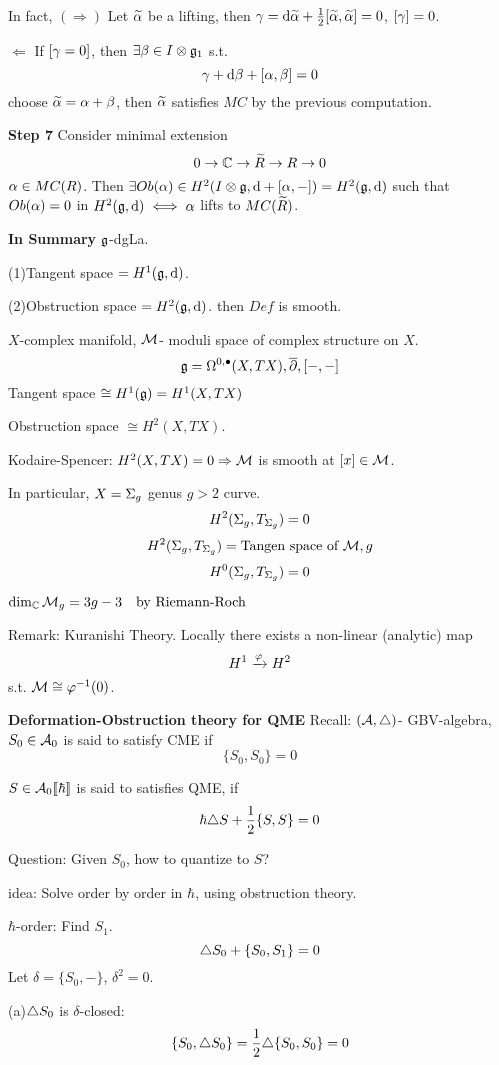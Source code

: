 In fact, $(\Rightarrow)$ Let $\widetilde{\alpha}$ be a lifting, then 
$\gamma=\mathrm{d}\widetilde{\alpha}+\frac{1}{2}[\widetilde{\alpha},\widetilde{\alpha}]=0$, $[\gamma]=0$.

$\Leftarrow$ If $[\gamma=0]$, then $\exists\beta\in I\otimes\mathfrak{g}_1$ s.t. 
$$\gamma+\mathrm{d}\beta+[\alpha,\beta]=0$$
choose $\widetilde{\alpha}=\alpha+\beta$, then $\widetilde{\alpha}$ satisfies $MC$
by the previous computation. 

\textbf{Step 7} Consider minimal extension 
$$0\to\mathbb{C}\to \widetilde{R}\to R\to 0$$
$\alpha\in MC(R)$. Then $\exists Ob(\alpha)\in H^2(I\otimes\mathfrak{g},\mathrm{d}+[\alpha,-])=H^2(\mathfrak{g},\mathrm{d})$
such that $Ob(\alpha)=0$ in $H^2(\mathfrak{g},\mathrm{d})\iff\alpha$ lifts to $MC(\widetilde{R})$.

\textbf{In Summary} $\mathfrak{g}$-dgLa.

(1)Tangent space $=H^1(\mathfrak{g},\mathrm{d})$.

(2)Obstruction space $=H^2(\mathfrak{g},\mathrm{d})$. then $Def$ is smooth.

\begin{example}$X$-complex manifold, 
$\mathcal{M}$- moduli space of complex structure on $X$.
$$\mathfrak{g}=\Omega^{0,\bullet}(X,TX),\overline{\partial},[-,-]$$
Tangent space $\cong H^1(\mathfrak{g})=H^1(X,TX)$

Obstruction space $\cong H^2(X,TX)$.

Kodaire-Spencer: $H^2(X,TX)=0\Rightarrow \mathcal{M}$ is smooth at $[x]\in\mathcal{M}$.
\end{example}

In particular, $X=\Sigma_g$ genus $g>2$ curve. 
$$H^2(\Sigma_g,T_{\Sigma_g})=0$$
$$H^2(\Sigma_g,T_{\Sigma_g})=\text{Tangen space of $\mathcal{M},g$}$$
$$H^0(\Sigma_g,T_{\Sigma_g})=0$$

$\dim_{\mathbb{C}}\mathcal{M}_g=3g-3\quad\text{by Riemann-Roch}$

Remark: Kuranishi Theory. Locally there exists a non-linear (analytic) map
$$H^1\xrightarrow{\varphi} H^2$$
s.t. $\mathcal{M}\cong\varphi^{-1}(0)$.

\textbf{Deformation-Obstruction theory for QME}
Recall: $(\mathcal{A},\triangle)$- GBV-algebra, $S_0\in\mathcal{A}_0$
is said to satisfy CME if 
$$\{S_0,S_0\}=0$$

$S\in\mathcal{A}_0[\![\hbar]\!]$ is said to satisfies QME, if
$$\hbar\triangle S+\frac{1}{2}\{S,S\}=0$$

Question: Given $S_0$, how to quantize to $S$?

idea: Solve order by order in $\hbar$, using obstruction theory.

$\hbar$-order: Find $S_1$. 
$$\triangle S_0+\{S_0,S_1\}=0$$
Let $\delta=\{S_0,-\}$, $\delta^2=0$. 

(a)$\triangle S_0$ is $\delta$-closed:
$$\{S_0,\triangle S_0\}=\frac{1}{2}\triangle\{S_0,S_0\}=0$$

